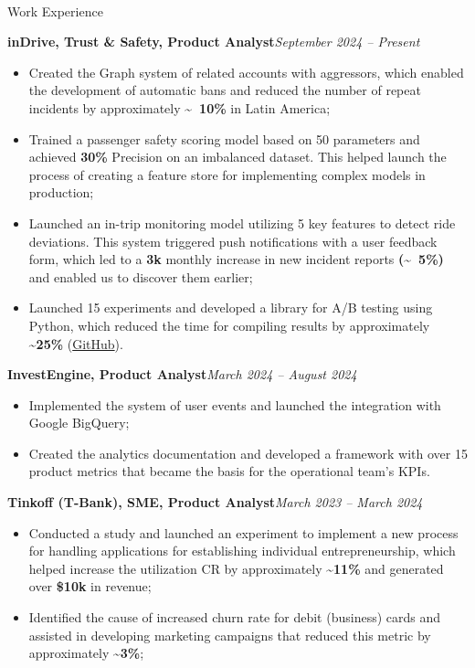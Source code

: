 \documentclass[]{mcdowellcv}
\renewenvironment{cvsubsection}[2]{%
  \begin{adjustwidth}{\subsectionmargin}{\subsectionmargin}%
    {\bfseries #1}\hfill #2\par\vspace{0.5em}%
}{%
  \end{adjustwidth}%
  \vspace*{\aftersubsectionspace}%
}
\renewcommand{\makeheader}{%
  \begin{center}
    \printname\\[0.5em]%
    \printcontacts%
  \end{center}%
  \vspace*{\afterheaderspace}%
}
\begin{document}
	\makeheader
	
	\begin{cvsection}{\Large Work Experience}
		\begin{cvsubsection}{inDrive, Trust \& Safety, Product Analyst}{\textit{September 2024 -- Present}}
			\begin{itemize}
				\item Created the Graph system of related accounts with aggressors, which enabled the development of automatic bans and reduced the number of repeat incidents by approximately \textbf{\textasciitilde ~10\%} in Latin America;
				\item Trained a passenger safety scoring model based on 50 parameters and achieved \textbf{30\%} Precision on an imbalanced dataset. This helped launch the process of creating a feature store for implementing complex models in production;
				\item Launched an in-trip monitoring model utilizing 5 key features to detect ride deviations. This system triggered push notifications with a user feedback form, which led to a \textbf{3k} monthly increase in new incident reports \textbf{(\textasciitilde ~5\%)} and enabled us to discover them earlier;
				\item Launched 15 experiments and developed a library for A/B testing using Python, which reduced the time for compiling results by approximately \textbf{\textasciitilde 25\%} (\href{https://github.com/Renarion/expab}{GitHub}).
			\end{itemize}
		\end{cvsubsection}
		
		\begin{cvsubsection}{InvestEngine, Product Analyst}{\textit{March 2024 -- August 2024}}
			\begin{itemize}
				\item Implemented the system of user events and launched the integration with Google BigQuery;
				\item Created the analytics documentation and developed a framework with over 15 product metrics that became the basis for the operational team's KPIs.
			\end{itemize}
		\end{cvsubsection}
		
		\begin{cvsubsection}{Tinkoff (T-Bank), SME, Product Analyst}{\textit{March 2023 -- March 2024}}
			\begin{itemize}
				\item Conducted a study and launched an experiment to implement a new process for handling applications for establishing individual entrepreneurship, which helped increase the utilization CR by approximately \textbf{\textasciitilde 11\%} and generated over \textbf{\$10k} in revenue;
				\item Identified the cause of increased churn rate for debit (business) cards and assisted in developing marketing campaigns that reduced this metric by approximately \textbf{\textasciitilde 3\%};
			\end{itemize}
		\end{cvsubsection}
		

\end{cvsection}
\end{document}
